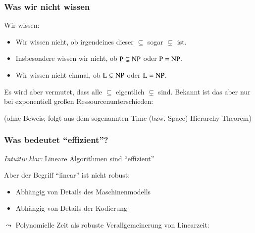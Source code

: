 \documentclass[aspectratio=1610,onlymath]{beamer}
\begin{document}
\begin{frame}\frametitle{Was wir nicht wissen}

Wir wissen:

\theobox{
\[\Scomplclass{L}\subseteq\Scomplclass{NL}\subseteq \Scomplclass{P}\subseteq\Scomplclass{NP}\subseteq\Scomplclass{PSpace}= \Scomplclass{NPSpace}\subseteq \Scomplclass{Exp}\subseteq \Scomplclass{NExp}\]
\vspace{-2.5ex}
}

\begin{itemize}
\item Wir wissen nicht, ob irgendeines dieser $\subseteq$ sogar $\subsetneq$ ist.
\item Insbesondere wissen wir nicht, ob ${\textsc{P}}\subsetneq{\textsc{NP}}$ oder ${\textsc{P}}={\textsc{NP}}$.
\item Wir wissen nicht einmal, ob ${\textsc{L}}\subsetneq{\textsc{NP}}$ oder ${\textsc{L}}={\textsc{NP}}$.
\end{itemize}\pause
Es wird aber vermutet, dass alle  $\subseteq$ eigentlich $\subsetneq$ sind.
% 
Bekannt ist das aber nur bei exponentiell großen Ressourcenunterschieden:


(ohne Beweis; folgt aus dem sogenannten \alert{Time (bzw. Space) Hierarchy Theorem})

\end{frame}



\begin{frame}\frametitle{Was bedeutet "`effizient"'?}

\emph{Intuitiv klar:} Lineare Algorithmen sind "`effizient"'
\bigskip\pause

Aber der Begriff "`linear"' ist nicht robust:
\begin{itemize}
\item Abhängig von Details des Maschinenmodells
\item Abhängig von Details der Kodierung
\end{itemize}
\bigskip
$\leadsto$ Polynomielle Zeit als robuste Verallgemeinerung von Linearzeit:\bigskip

%

\end{frame}
\end{document}
